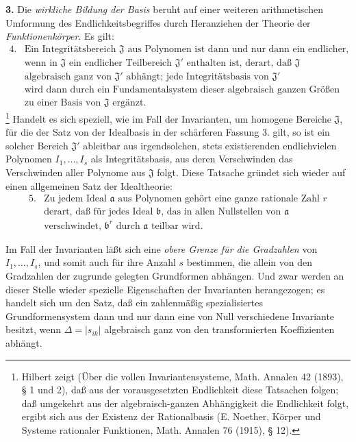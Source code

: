 \documentclass[11pt]{article}
\providecommand{\mJ}{\mathfrak J}
\providecommand{\ma}{\mathfrak a}
\providecommand{\mb}{\mathfrak b}
\providecommand{\D}{\Delta}
\begin{document}
\textbf{3.} Die \emph{wirkliche Bildung der Basis} beruht auf einer weiteren arithmetischen Umformung des Endlichkeitsbegriffes durch Heranziehen der Theorie der \emph{Funktionenkörper}. Es gilt:
\[
\begin{array}{ll}
4.& \text{Ein Integritätsbereich }\mJ\text{ aus Polynomen ist dann und nur dann ein endlicher,}\\
& \text{wenn in }\mJ\text{ ein endlicher Teilbereich }\mJ'\text{ enthalten ist, derart, daß }\mJ\\
& \text{algebraisch ganz von }\mJ'\text{ abhängt; jede Integritätsbasis von }\mJ'\\
& \text{wird dann durch ein Fundamentalsystem dieser algebraisch ganzen Größen}\\
& \text{zu einer Basis von }\mJ\text{ ergänzt.}
\end{array}
\]
\footnote{Hilbert zeigt (Über die vollen Invariantensysteme, Math. Annalen 42 (1893), § 1 und 2), daß aus der vorausgesetzten Endlichkeit diese Tatsachen folgen; daß umgekehrt aus der algebraisch-ganzen Abhängigkeit die Endlichkeit folgt, ergibt sich aus der Existenz der Rationalbasis (E. Noether, Körper und Systeme rationaler Funktionen, Math. Annalen 76 (1915), § 12).}
Handelt es sich speziell, wie im Fall der Invarianten, um homogene Bereiche $\mJ$, für die der Satz von der Idealbasis in der schärferen Fassung 3. gilt, so ist ein solcher Bereich $\mJ'$ ableitbar aus irgendsolchen, stets existierenden endlichvielen Polynomen $I_1,\ldots,I_s$ als Integritätsbasis, aus deren Verschwinden das Verschwinden aller Polynome aus $\mJ$ folgt. Diese Tatsache gründet sich wieder auf einen allgemeinen Satz der Idealtheorie:
\[
\begin{array}{ll}
5.& \text{Zu jedem Ideal }\ma\text{ aus Polynomen gehört eine ganze rationale Zahl }r\\
& \text{derart, daß für jedes Ideal }\mb\text{, das in allen Nullstellen von }\ma\\
& \text{verschwindet, }\mb^r\text{ durch }\ma\text{ teilbar wird.}
\end{array}
\]

Im Fall der Invarianten läßt sich eine \emph{obere Grenze für die Gradzahlen} von $I_1,\ldots,I_s$, und somit auch für ihre Anzahl $s$ bestimmen, die allein von den Gradzahlen der zugrunde gelegten Grundformen abhängen. Und zwar werden an dieser Stelle wieder spezielle Eigenschaften der Invarianten herangezogen; es handelt sich um den Satz, daß ein zahlenmäßig spezialisiertes Grundformensystem dann und nur dann eine von Null verschiedene Invariante besitzt, wenn $\D=|s_{ik}|$ algebraisch ganz von den transformierten Koeffizienten abhängt.
\end{document}
